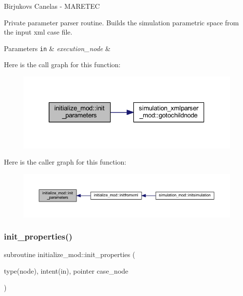 Birjukovs Canelas -\/ M\+A\+R\+E\+T\+EC 

Private parameter parser routine. Builds the simulation parametric space from the input xml case file. 
\begin{DoxyParams}[1]{Parameters}
\mbox{\tt in}  & {\em execution\+\_\+node} & \\
\hline
\end{DoxyParams}
Here is the call graph for this function\+:
\nopagebreak
\begin{figure}[H]
\begin{center}
\leavevmode
\includegraphics[width=320pt]{namespaceinitialize__mod_aac9d9dabb797c83e360f9ae60a7e65e3_cgraph}
\end{center}
\end{figure}
Here is the caller graph for this function\+:
\nopagebreak
\begin{figure}[H]
\begin{center}
\leavevmode
\includegraphics[width=350pt]{namespaceinitialize__mod_aac9d9dabb797c83e360f9ae60a7e65e3_icgraph}
\end{center}
\end{figure}
\mbox{\label{namespaceinitialize__mod_a4c7a93dca8bb7b573e91f877033ab22a}} 
\subsubsection{\texorpdfstring{init\+\_\+properties()}{init\_properties()}}
{\footnotesize\ttfamily subroutine initialize\+\_\+mod\+::init\+\_\+properties (\begin{DoxyParamCaption}\item[{type(node), intent(in), pointer}]{case\+\_\+node }\end{DoxyParamCaption})\hspace{0.3cm}{\ttfamily [private]}}



